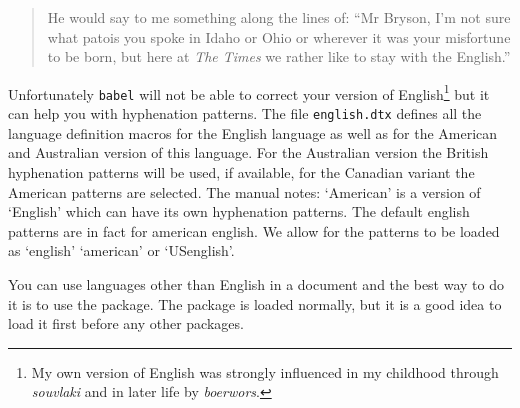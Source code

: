 \begin{multicols}{2}
\begin{quotation}
He would say to me something along the lines of: ``Mr Bryson, I'm not sure what patois you spoke in Idaho or Ohio or wherever it was your misfortune to be born, but here at \textit{The Times} we rather like to stay with the English.''
\end{quotation}

Unfortunately \texttt{babel} will not be able to correct your version of English\footnote{My own version of English was strongly influenced in my childhood through \textit{souvlaki} and in later life by \textit{boerwors}.} but it can help you with hyphenation patterns. The file \texttt{english.dtx}
defines all the language definition macros for the English
language as well as for the American and Australian version of this language. For
the Australian version the British hyphenation patterns will be used, if available,
for the Canadian variant the American patterns are selected. The manual notes:
`American' is a version of `English' which can have its own hyphenation patterns.
The default english patterns are in fact for american english. We allow for the
patterns to be loaded as `english' `american' or `USenglish'.


You can use languages other than English in a document and the best way to do it is to use the  package. The package is loaded normally, but it is a good idea to load it first before any other packages.

  

\end{multicols}

